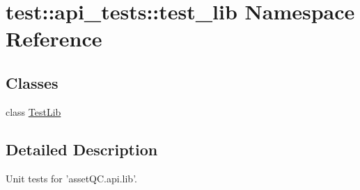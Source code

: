 \hypertarget{namespacetest_1_1api__tests_1_1test__lib}{\section{test\-:\-:api\-\_\-tests\-:\-:test\-\_\-lib \-Namespace \-Reference}
\label{d5/dc8/namespacetest_1_1api__tests_1_1test__lib}
}
\subsection*{\-Classes}
\begin{DoxyCompactItemize}
\item 
class \hyperlink{classtest_1_1api__tests_1_1test__lib_1_1TestLib}{\-Test\-Lib}
\end{DoxyCompactItemize}


\subsection{\-Detailed \-Description}
\begin{DoxyVerb}
Unit tests for 'assetQC.api.lib'.
\end{DoxyVerb}
 